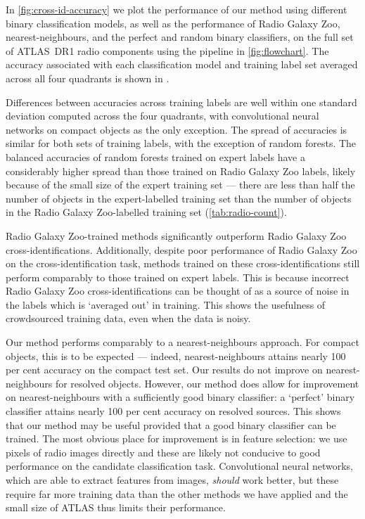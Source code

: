     In \autoref{fig:cross-id-accuracy} we plot the performance {of our
    method using different binary classification models}, as well as the
    performance of Radio Galaxy Zoo, nearest-neighbours, and the perfect and
    random binary classifiers, on the full set of ATLAS~DR1 radio components
    using the pipeline in \autoref{fig:flowchart}. The accuracy
    {associated with each classification model} and training label set
    averaged across all four quadrants is shown in .

    Differences between accuracies across training labels are well within one
    standard deviation computed across the four quadrants, with convolutional
    neural networks on compact objects as the only exception. The spread of
    accuracies is similar for both sets of training labels, with the exception
    of random forests. The balanced accuracies of random forests trained on
    expert labels have a considerably higher spread than those trained on
    Radio Galaxy Zoo labels, likely because of the small size of the expert
    training set --- there are less than half the number of objects in the
    expert-labelled training set than the number of objects in the Radio
    Galaxy Zoo-labelled training set (\autoref{tab:radio-count}).

    Radio Galaxy Zoo-trained methods significantly outperform Radio Galaxy Zoo
    cross-identifications. Additionally, despite poor performance of Radio
    Galaxy Zoo on the cross-identification task, methods trained on these
    cross-identifications still perform comparably to those trained on expert
    labels. This is because incorrect Radio Galaxy Zoo cross-identifications
    can be thought of as a source of noise in the labels which is `averaged out'
    in training. This shows the usefulness of crowdsourced training data, even
    when the data is noisy.

    Our method performs comparably to a nearest-neighbours approach. For
    compact objects, this is to be expected --- indeed, nearest-neighbours
    attains nearly 100 per cent accuracy on the compact test set. Our results
    do not improve on nearest-neighbours for resolved objects. However, our
    method does allow for improvement on nearest-neighbours with a
    sufficiently good binary classifier: a `perfect' binary classifier attains
    nearly 100 per cent accuracy on resolved sources. This shows that our
    method may be useful provided that a good binary classifier can be
    trained. The most obvious place for improvement is in feature selection:
    we use pixels of radio images directly and these are likely not conducive
    to good performance on the candidate classification task. Convolutional
    neural networks, which are able to extract features from images,
    \emph{should} work better, but these require far more training data than
    the other methods we have applied and the small size of ATLAS thus limits their performance.

